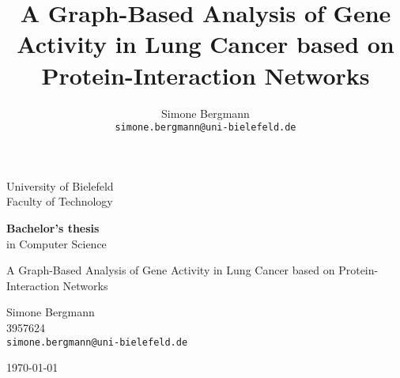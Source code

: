 \documentclass[11pt,a4paper]{article}
\title{A Graph-Based Analysis of Gene Activity in Lung Cancer based on Protein-Interaction Networks}
\author{Simone Bergmann\\
\texttt{simone.bergmann@uni-bielefeld.de}}
\begin{document}
\begin{titlepage}

  \begin{center}
    \Huge{University of Bielefeld} \\

    \vspace{.5cm}
    \Large{Faculty of Technology}

    \vspace{1cm}
    \textbf{Bachelor's thesis}\\
    in Computer Science
    \vspace{2cm}

    \Large{A Graph-Based Analysis of Gene Activity in Lung Cancer based on Protein-Interaction Networks}

    \vspace{2cm}

    Simone Bergmann\\
    3957624\\
    \texttt{simone.bergmann@uni-bielefeld.de}
    \vspace{0.5cm}

    \today
    \vspace{0.5cm}

  \end{center}
\end{titlepage}

\tableofcontents
\newpage


















\newpage

\end{document}
